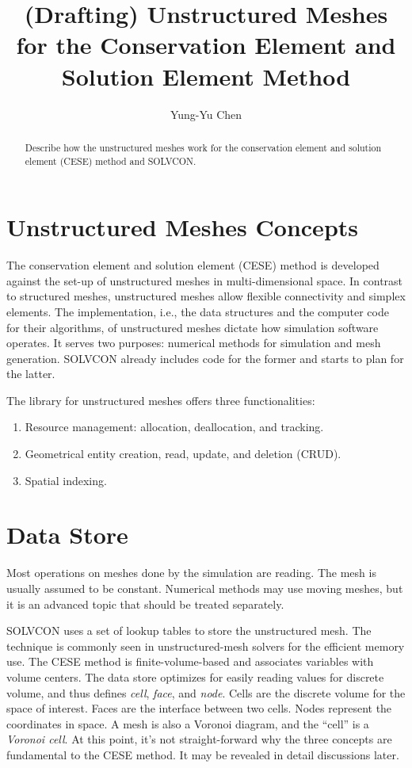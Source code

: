 \documentclass[11pt,dvips]{article}
\title{
%
(Drafting) Unstructured Meshes for the Conservation Element and Solution
Element Method
%
}
\author{
%
Yung-Yu Chen
%
}
\numberwithin{equation}{section}
\begin{document}
\maketitle

\begin{abstract}
%
Describe how the unstructured meshes work for the conservation element and
solution element (CESE) method and SOLVCON.
%
\end{abstract}

\section{Unstructured Meshes Concepts}
%
\label{s:concept}

The conservation element and solution element (CESE) method is developed
against the set-up of unstructured meshes in multi-dimensional
space\cite{mavriplis_unstructured_1997, wang_2d_1999}.  In contrast to
structured meshes, unstructured meshes allow flexible connectivity and simplex
elements.  The implementation, i.e., the data structures and the computer code
for their algorithms, of unstructured meshes dictate how simulation software
operates.  It serves two purposes: numerical methods for simulation and mesh
generation.  SOLVCON already includes code for the former and starts to plan
for the latter.

The library for unstructured meshes offers three functionalities:
%
\begin{enumerate}
%
\item Resource management: allocation, deallocation, and tracking.
%
\item Geometrical entity creation, read, update, and deletion (CRUD).
%
\item Spatial indexing.
%
\end{enumerate}

\clearpage
%
\section{Data Store}
%
\label{s:storage}

Most operations on meshes done by the simulation are reading.  The mesh is
usually assumed to be constant.  Numerical methods may use moving meshes, but
it is an advanced topic that should be treated separately.

SOLVCON uses a set of lookup tables to store the unstructured mesh.  The
technique is commonly seen in unstructured-mesh solvers for the efficient
memory use.  The CESE method is finite-volume-based and associates variables
with volume centers.  The data store optimizes for easily reading values for
discrete volume, and thus defines \textit{cell}, \textit{face}, and
\textit{node}.  Cells are the discrete volume for the space of interest.  Faces
are the interface between two cells.  Nodes represent the coordinates in space.
A mesh is also a Voronoi diagram, and the ``cell'' is a \textit{Voronoi
cell}\cite{berg_computational_2010}.  At this point, it's not straight-forward
why the three concepts are fundamental to the CESE method.  It may be revealed
in detail discussions later.
\end{document}
